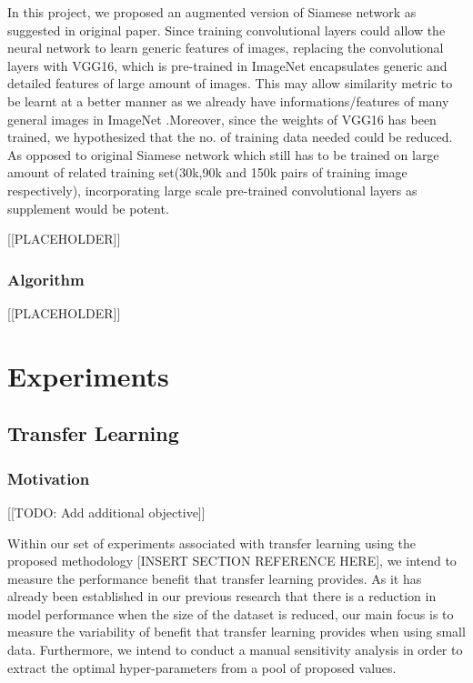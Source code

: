 \documentclass{article}
\begin{document}
In this project, we proposed an augmented version of Siamese network as suggested in original paper. Since training convolutional layers
could allow the neural network to learn generic features of images, replacing the convolutional layers with VGG16, which is pre-trained
in ImageNet encapsulates generic and detailed features of large amount of images. This may allow similarity metric to be learnt at a better manner as we already have informations/features of many general images in ImageNet .Moreover, since the weights of
VGG16 has been trained, we hypothesized that the no. of training data needed could be reduced. As opposed to original Siamese network 
which still has to be trained on large amount of related training set(30k,90k and 150k pairs of training image respectively),
incorporating large scale pre-trained convolutional layers as supplement would be potent.

[[PLACEHOLDER]]

\subsubsection{\textbf{Algorithm}}

[[PLACEHOLDER]]

\section{Experiments}
\label{sec:experiments}

\subsection{Transfer Learning}

\subsubsection{\textbf{Motivation}}

[[TODO: Add additional objective]]

Within our set of experiments associated with transfer learning using the proposed methodology [INSERT SECTION REFERENCE HERE], we intend to measure the performance benefit that transfer learning provides. As it has already been established in our previous research that there is a reduction in model performance when the size of the dataset is reduced, our main focus is to measure the variability of benefit that transfer learning provides when using small data. Furthermore, we intend to conduct a manual sensitivity analysis in order to extract the optimal hyper-parameters from a pool of proposed values.
\end{document}
